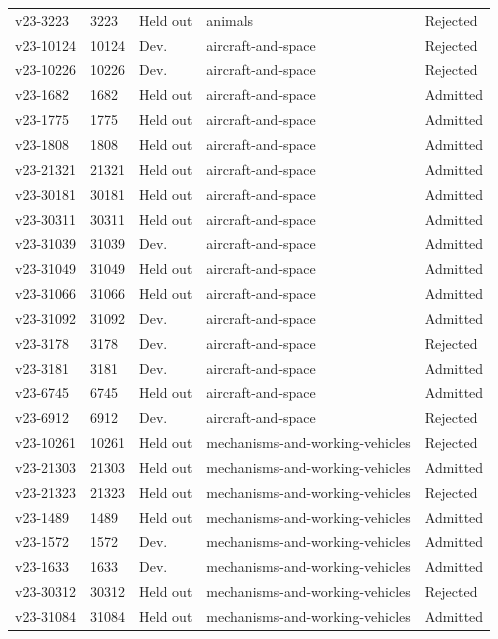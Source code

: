 \begin{longtable}{lllp{}l}
v23-3223 & 3223 & Held out & animals & Rejected\\
v23-10124 & 10124 & Dev. & aircraft-and-space & Rejected\\
v23-10226 & 10226 & Dev. & aircraft-and-space & Rejected\\
v23-1682 & 1682 & Held out & aircraft-and-space & Admitted\\
v23-1775 & 1775 & Held out & aircraft-and-space & Admitted\\
v23-1808 & 1808 & Held out & aircraft-and-space & Admitted\\
v23-21321 & 21321 & Held out & aircraft-and-space & Admitted\\
v23-30181 & 30181 & Held out & aircraft-and-space & Admitted\\
v23-30311 & 30311 & Held out & aircraft-and-space & Admitted\\
v23-31039 & 31039 & Dev. & aircraft-and-space & Admitted\\
v23-31049 & 31049 & Held out & aircraft-and-space & Admitted\\
v23-31066 & 31066 & Held out & aircraft-and-space & Admitted\\
v23-31092 & 31092 & Dev. & aircraft-and-space & Admitted\\
v23-3178 & 3178 & Dev. & aircraft-and-space & Rejected\\
v23-3181 & 3181 & Dev. & aircraft-and-space & Admitted\\
v23-6745 & 6745 & Held out & aircraft-and-space & Admitted\\
v23-6912 & 6912 & Dev. & aircraft-and-space & Rejected\\
v23-10261 & 10261 & Held out & mechanisms-and-working-vehicles & Rejected\\
v23-21303 & 21303 & Held out & mechanisms-and-working-vehicles & Admitted\\
v23-21323 & 21323 & Held out & mechanisms-and-working-vehicles & Rejected\\
v23-1489 & 1489 & Held out & mechanisms-and-working-vehicles & Admitted\\
v23-1572 & 1572 & Dev. & mechanisms-and-working-vehicles & Admitted\\
v23-1633 & 1633 & Dev. & mechanisms-and-working-vehicles & Admitted\\
v23-30312 & 30312 & Held out & mechanisms-and-working-vehicles & Rejected\\
v23-31084 & 31084 & Held out & mechanisms-and-working-vehicles & Admitted\\

\end{longtable}

